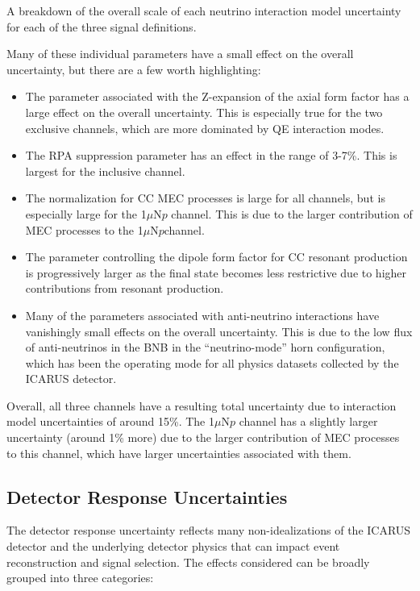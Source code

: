 \begin{table}
    \centering
    \caption{A breakdown of the overall scale of each neutrino interaction model uncertainty for each of the three signal definitions.}
    \resizebox{0.99\textwidth}{!}{}
    \label{tab:xsec}
\end{table}

Many of these individual parameters have a small effect on the overall uncertainty, but there are a few worth highlighting:

\begin{itemize}
    \item The parameter associated with the Z-expansion of the axial form factor has a large effect on the overall uncertainty. This is especially true for the two exclusive channels, which are more dominated by QE interaction modes.
    \item The RPA suppression parameter has an effect in the range of 3-7\%. This is largest for the inclusive channel.
    \item The normalization for CC MEC processes is large for all channels, but is especially large for the 1$\mu$N$p$ channel. This is due to the larger contribution of MEC processes to the 1$\mu$N$p$channel.
    \item The parameter controlling the dipole form factor for CC resonant production is progressively larger as the final state becomes less restrictive due to higher contributions from resonant production.
    \item Many of the parameters associated with anti-neutrino interactions have vanishingly small effects on the overall uncertainty. This is due to the low flux of anti-neutrinos in the BNB in the ``neutrino-mode'' horn configuration, which has been the operating mode for all physics datasets collected by the ICARUS detector.
\end{itemize}

Overall, all three channels have a resulting total uncertainty due to interaction model uncertainties of around 15\%. The 1$\mu$N$p$ channel has a slightly larger uncertainty (around 1\% more) due to the larger contribution of MEC processes to this channel, which have larger uncertainties associated with them.

\subsection{Detector Response Uncertainties}
\label{sec:detector_response}
The detector response uncertainty reflects many non-idealizations of the ICARUS detector and the underlying detector physics that can impact event reconstruction and signal selection. The effects considered can be broadly grouped into three categories:

